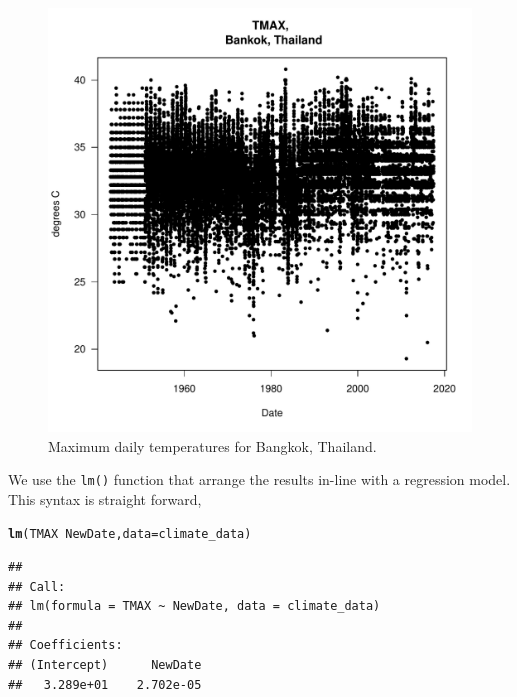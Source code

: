 \documentclass{article}\usepackage[]{graphicx}\usepackage[]{color}
\makeatletter
\def\maxwidth{ %
  \ifdim\Gin@nat@width>\linewidth
    \linewidth
  \else
    \Gin@nat@width
  \fi
}
\newcommand{\hlopt}[1]{\textcolor[rgb]{0,0,0}{#1}}%
\newcommand{\hlstd}[1]{\textcolor[rgb]{0.345,0.345,0.345}{#1}}%
\newcommand{\hlkwc}[1]{\textcolor[rgb]{0.333,0.667,0.333}{#1}}%
\newcommand{\hlkwd}[1]{\textcolor[rgb]{0.737,0.353,0.396}{\textbf{#1}}}%
\newenvironment{kframe}{%
 \def\at@end@of@kframe{}%
 \ifinner\ifhmode%
  \def\at@end@of@kframe{\end{minipage}}%
  \begin{minipage}{\columnwidth}%
 \fi\fi%
 \def\FrameCommand##1{\hskip\@totalleftmargin \hskip-\fboxsep
 \colorbox{shadecolor}{##1}\hskip-\fboxsep
     \hskip-\linewidth \hskip-\@totalleftmargin \hskip\columnwidth}%
 \MakeFramed {\advance\hsize-\width
   \@totalleftmargin\z@ \linewidth\hsize
   \@setminipage}}%
 {\par\unskip\endMakeFramed%
 \at@end@of@kframe}
\newenvironment{knitrout}{}{} %
\makeatother
\begin{document}
\begin{figure}
\caption{Maximum daily temperatures for Bangkok, Thailand.}
\label{fig:test12}
\begin{knitrout}
\color{fgcolor}
\includegraphics[width=\maxwidth]{figure/Tmaxplot-1} 

\end{knitrout}
\end{figure}

We use the \texttt{lm()} function that arrange the results in-line with a regression model. This syntax is straight forward,  

\begin{knitrout}
\color{fgcolor}\begin{kframe}
\begin{alltt}
\hlkwd{lm}\hlstd{(TMAX} \hlopt{~} \hlstd{NewDate,} \hlkwc{data}\hlstd{=climate_data)}
\end{alltt}
\begin{verbatim}
## 
## Call:
## lm(formula = TMAX ~ NewDate, data = climate_data)
## 
## Coefficients:
## (Intercept)      NewDate  
##   3.289e+01    2.702e-05
\end{verbatim}
\end{kframe}
\end{knitrout}
\end{document}
